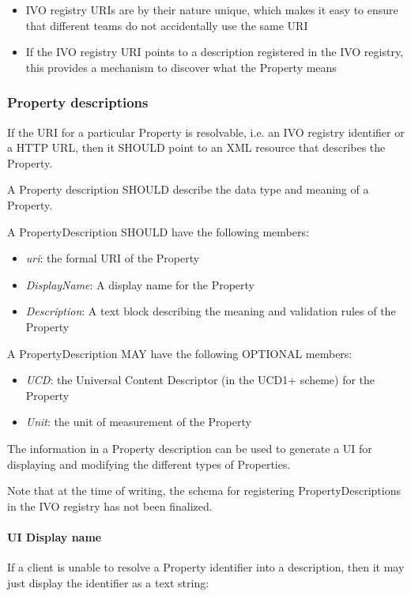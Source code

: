 \documentclass[11pt,a4paper]{ivoa}
\begin{document}
\begin{itemize}
    \item IVO registry URIs are by their nature unique, which makes it easy to ensure that different teams do not accidentally use the same URI
    \item If the IVO registry URI points to a description registered in the IVO registry, this provides a mechanism to discover what the Property means
\end{itemize}

\subsubsection{Property descriptions}
\label{subsubsec:property descriptions}
If the URI for a particular Property is resolvable, i.e. an IVO registry identifier or a HTTP URL, then it SHOULD point to an XML resource that describes the Property.

A Property description SHOULD describe the data type and meaning of a Property.

A PropertyDescription SHOULD have the following members:

\begin{itemize}
    \item \emph{uri}: the formal URI of the Property
    \item \emph{DisplayName}: A display name for the Property
    \item \emph{Description}: A text block describing the meaning and validation rules of the Property
\end{itemize}

A PropertyDescription MAY have the following OPTIONAL members:

\begin{itemize}
    \item \emph{UCD}: the Universal Content Descriptor (in the UCD1+ scheme) for the Property
    \item \emph{Unit}: the unit of measurement of the Property
\end{itemize}

The information in a Property description can be used to generate a UI for displaying and modifying the different types of Properties.

Note that at the time of writing, the schema for registering PropertyDescriptions in the IVO registry has not been finalized.

\paragraph{UI Display name}
If a client is unable to resolve a Property identifier into a description, then it may just display the identifier as a text string:
\end{document}
